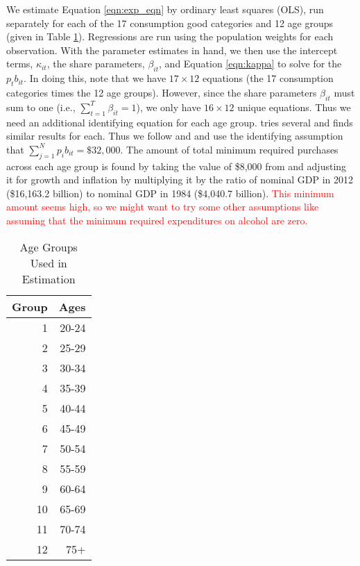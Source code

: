 \documentclass[article,11pt,letterpaper,fleqn]{article}
\theoremstyle{definition}
\numberwithin{equation}{section}
\newcommand{\cn}{\citeasnoun} %
\begin{document}
\noindent\noindent  We estimate Equation \ref{eqn:exp_eqn} by ordinary least squares (OLS), run separately for each of the 17 consumption good categories and 12 age groups (given in Table \ref{tab:ages}).  Regressions are run using the population weights for each observation.  With the parameter estimates in hand, we then use the intercept terms, $\kappa_{it}$, the share parameters, $\beta_{it}$, and Equation \ref{eqn:kappa} to solve for the $p_{t}b_{it}$.  In doing this, note that we have $17\times 12$ equations (the 17 consumption categories times the 12 age groups).  However, since the share parameters $\beta_{it}$ must sum to one (i.e., $\sum_{t=1}^{T}\beta_{it}=1$), we only have $16\times 12$ unique equations.  Thus we need an additional identifying equation for each age group.  \cn{King1979} tries several and finds similar results for each. Thus we follow \cn{King1979} and \cn{FR1993} and  use the identifying assumption that $\sum_{j=1}^{N}p_{i}b_{it}=\$32,000$.  The amount of total minimum required purchases across each age group is found by taking the value of \$8,000 from \cn{FR1993} and adjusting it for growth and inflation by multiplying it by the ratio of nominal GDP in 2012 (\$16,163.2 billion) to nominal GDP in 1984 (\$4,040.7 billion). \textcolor{red}{This minimum amount seems high, so we might want to try some other assumptions like assuming that the minimum required expenditures on alcohol are zero.}

\begin{table}[h!]
  \centering
  \caption{Age Groups Used in Estimation}
    \begin{tabular}{rr}
    \hline
    \hline
    Group & Ages \\
    \hline
    1     & 20-24 \\
    2     & 25-29 \\
    3     & 30-34 \\
    4     & 35-39 \\
    5     & 40-44 \\
    6     & 45-49 \\
    7     & 50-54 \\
    8     & 55-59 \\
    9     & 60-64 \\
    10    & 65-69 \\
    11    & 70-74 \\
    12    & 75+ \\
    \hline
    \hline
    \end{tabular}%
  \label{tab:ages}%
\end{table}%
\end{document}
